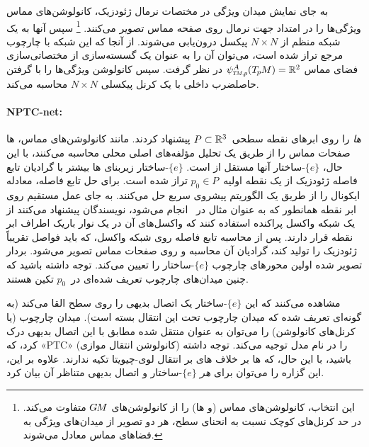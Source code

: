 به جای نمایش میدان ویژگی در مختصات نرمال ژئودزیک، کانولوشن‌های مماس ویژگی‌ها را در امتداد جهت نرمال روی صفحه مماس تصویر می‌کنند.%
\footnote{
    این انتخاب، کانولوشن‌های مماس (و ها) را از کانولوشن‌های $G\mkern-1.4muM$ متفاوت می‌کند.
    در حد کرنل‌های کوچک نسبت به انحنای سطح، هر دو تصویر از میدان‌های ویژگی به فضاهای مماس معادل می‌شوند.
}
سپس آنها به یک شبکه منظم از ${N\times N}$ پیکسل درون‌یابی می‌شوند.
از آنجا که این شبکه با چارچوب مرجع تراز شده است، می‌توان آن را به عنوان یک گسسته‌سازی از مختصاتی‌سازی فضای مماس $\psiTMp^A(\TpM) = \R^2$ در نظر گرفت.
سپس کانولوشن ویژگی‌ها را با گرفتن حاصلضرب داخلی با یک کرنل پیکسلی ${N\times N}$ محاسبه می‌کند.





\paragraph{NPTC-net:}
\citet{jin2019NPTCnet} \emph{ها} را روی ابرهای نقطه سطحی~${P\subset\mathbb{R}^3}$ پیشنهاد کردند.
مانند کانولوشن‌های مماس، ها صفحات مماس را از طریق یک تحلیل مؤلفه‌های اصلی محلی محاسبه می‌کنند،
با این حال، $\{e\}$-ساختار آنها مستقل از  است.
$\{e\}$-ساختار زیربنای ها بیشتر با گرادیان تابع فاصله ژئودزیک از یک نقطه اولیه~$p_0 \in P$ تراز شده است.
برای حل تابع فاصله، \citet{jin2019NPTCnet} معادله ایکونال را از طریق یک الگوریتم پیشروی سریع حل می‌کنند.
به جای عمل مستقیم روی ابر نقطه همانطور که به عنوان مثال در~\cite{Crane2017HeatMethodDistance} انجام می‌شود، نویسندگان پیشنهاد می‌کنند از یک شبکه واکسل پراکنده استفاده کنند که واکسل‌های آن در یک نوار باریک اطراف ابر نقطه قرار دارند.
پس از محاسبه تابع فاصله روی شبکه واکسل، که باید فواصل تقریباً ژئودزیک را تولید کند، گرادیان آن محاسبه و روی صفحات مماس تصویر می‌شود.
بردار تصویر شده اولین محورهای چارچوب $\{e\}$-ساختار را تعیین می‌کند.
توجه داشته باشید که چنین میدان‌های چارچوب تعریف شده‌ای در~$p_0$ تکین هستند.

\citet{jin2019NPTCnet} مشاهده می‌کنند که این $\{e\}$-ساختار یک اتصال بدیهی را روی سطح القا می‌کند (به گونه‌ای تعریف شده که میدان چارچوب تحت این انتقال بسته است).
میدان چارچوب (یا کرنل‌های کانولوشن) را می‌توان به عنوان منتقل شده مطابق با این اتصال بدیهی درک کرد، که «PTC» (کانولوشن انتقال موازی) را در نام مدل توجیه می‌کند.
توجه داشته باشید، با این حال، که ها بر خلاف های \citet{schonsheck2018parallel} بر انتقال لوی-چیویتا تکیه ندارند.
علاوه بر این، این گزاره را می‌توان برای \emph{هر} $\{e\}$-ساختار و اتصال بدیهی متناظر آن بیان کرد.

